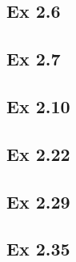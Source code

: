 \subsection*{Ex 2.6}

\subsection*{Ex 2.7}

\subsection*{Ex 2.10}

\subsection*{Ex 2.22}

\subsection*{Ex 2.29}

\subsection*{Ex 2.35}
